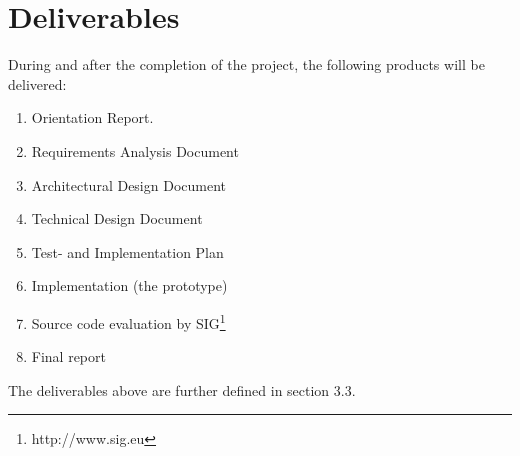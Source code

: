 \section{Deliverables}
During and after the completion of the project, the following products will be delivered:\\
\begin{enumerate}
\item Orientation Report. 
\item Requirements Analysis Document
\item Architectural Design Document
\item Technical Design Document
\item Test- and Implementation Plan
\item Implementation (the prototype)
\item Source code evaluation by SIG\footnote{http://www.sig.eu}
\item Final report 
\end{enumerate}
The deliverables above are further defined in section 3.3.